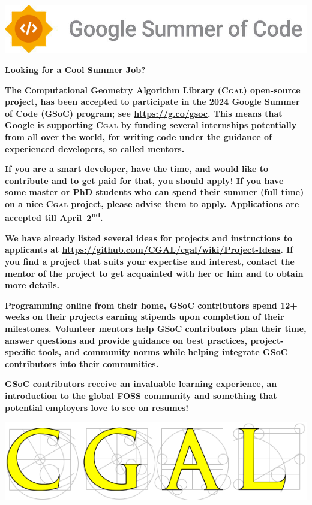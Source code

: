 \documentclass[12pt,a4paper]{article}
\newcommand{\cgal}{\textsc{Cgal}}
\begin{document}
\begin{framed}
  \vspace{10pt}
  \newlength{\cgalwidth}\setlength{\cgalwidth}{\linewidth}
  \includegraphics[width=\cgalwidth]{../../images/gsoc/GSoC-Horizontal.png}
  \begin{center}
    \textbf{\Huge Looking for a Cool Summer Job?}
  \end{center}
  \textbf{\large The Computational Geometry Algorithm Library
    (\cgal{}) open-source project, has been accepted to participate in
    the 2024 Google Summer of Code (GSoC) program; see
    \url{https://g.co/gsoc}.  This means that
    Google is supporting \cgal{} by funding several internships
    potentially from all over the world, for writing code under the
    guidance of experienced developers, so called mentors.}

  \textbf{{\large If you are a smart developer, have the time, and
    would like to contribute and to get paid for that, you should
    apply! If you have some master or PhD students who can spend their
    summer (full time) on a nice \cgal{} project, please advise them
    to apply.} Applications are accepted till April~2\textsuperscript{nd}.}

  \textbf{\large We have already listed several ideas for projects and
    instructions to applicants at
    \url{https://github.com/CGAL/cgal/wiki/Project-Ideas}. If you
    find a project that suits your expertise and interest, contact the
    mentor of the project to get acquainted with her or him and to
    obtain more details.}

  \textbf{Programming online from their home, GSoC contributors spend
    12+ weeks on their projects earning stipends upon completion of
    their milestones.  Volunteer mentors help GSoC contributors plan
    their time, answer questions and provide guidance on best
    practices, project-speciﬁc tools, and community norms while
    helping integrate GSoC contributors into their communities.}

  \textbf{GSoC contributors receive an invaluable learning experience,
    an introduction to the global FOSS community and something that
    potential employers love to see on resumes!}

  \centering\includegraphics[width=\cgalwidth]{../../images/cgal_front_page_2013.png}
\end{framed}
\end{document}
